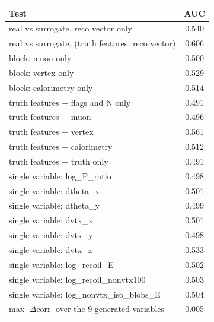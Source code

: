 \begin{tabular}{lc}
\toprule
Test & AUC \\
\midrule
real vs surrogate, reco vector only & 0.540 \\
real vs surrogate, (truth features, reco vector) & 0.606 \\
\midrule
block: muon only & 0.500 \\
block: vertex only & 0.529 \\
block: calorimetry only & 0.514 \\
truth features + flags and N only & 0.491 \\
truth features + muon & 0.496 \\
truth features + vertex & 0.561 \\
truth features + calorimetry & 0.512 \\
truth features + truth only & 0.491 \\
single variable: log\_P\_ratio & 0.498 \\
single variable: dtheta\_x & 0.501 \\
single variable: dtheta\_y & 0.499 \\
single variable: dvtx\_x & 0.501 \\
single variable: dvtx\_y & 0.498 \\
single variable: dvtx\_z & 0.533 \\
single variable: log\_recoil\_E & 0.502 \\
single variable: log\_recoil\_nonvtx100 & 0.503 \\
single variable: log\_nonvtx\_iso\_blobs\_E & 0.504 \\
\midrule
max $|\Delta$corr$|$ over the 9 generated variables & 0.005 \\
\bottomrule
\end{tabular}
